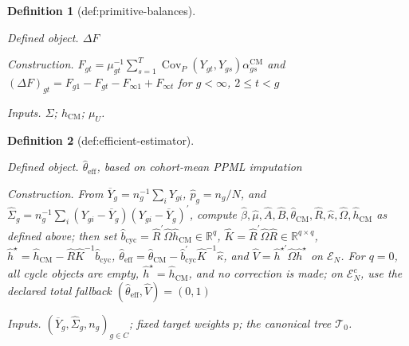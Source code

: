 \documentclass{article}
\newtheorem{definition}{Definition}
\begin{document}
\begin{definition}[def:primitive-balances]\label{def:primitive-balances}
\par\smallskip\noindent\emph{Defined object.} \(\Delta F\)
\par\smallskip\noindent\emph{Construction.} \(F_{gt}=\mu_{gt}^{-1}\sum_{s=1}^T\operatorname{Cov}_P(Y_{gt},Y_{gs})\alpha^{\mathrm{CM}}_{gs}\) and \((\Delta F)_{gt}=F_{g1}-F_{gt}-F_{\infty1}+F_{\infty t}\) for \(g<\infty\), \(2\le t<g\)
\par\smallskip\noindent\emph{Inputs.} \(\Sigma\); \(h_{\mathrm{CM}}\); \(\mu_U\).
\end{definition}

\begin{definition}[def:efficient-estimator]\label{def:efficient-estimator}
\par\smallskip\noindent\emph{Defined object.} \(\widehat\theta_{\mathrm{eff}}\), based on cohort-mean PPML imputation
\par\smallskip\noindent\emph{Construction.} From \(\overline Y_g=n_g^{-1}\sum_iY_{gi}\), \(\widehat p_g=n_g/N\), and \(\widehat\Sigma_g=n_g^{-1}\sum_i(Y_{gi}-\overline Y_g)(Y_{gi}-\overline Y_g)^{\prime}\), compute \(\widehat\beta,\widehat\mu,\widehat A,\widehat B,\widehat\theta_{\mathrm{CM}},\widehat R,\widehat\kappa,\widehat\Omega,\widehat h_{\mathrm{CM}}\) as defined above; then set \(\widehat b_{\mathrm{cyc}}=\widehat R^{\prime}\widehat\Omega\widehat h_{\mathrm{CM}}\in\mathbb R^q\), \(\widehat K=\widehat R^{\prime}\widehat\Omega\widehat R\in\mathbb R^{q\times q}\), \(\widehat h^{\star}=\widehat h_{\mathrm{CM}}-\widehat R\widehat K^{-1}\widehat b_{\mathrm{cyc}}\), \(\widehat\theta_{\mathrm{eff}}=\widehat\theta_{\mathrm{CM}}-\widehat b_{\mathrm{cyc}}^{\prime}\widehat K^{-1}\widehat\kappa\), and \(\widehat V=\widehat h^{\star\prime}\widehat\Omega\widehat h^{\star}\) on \(\mathcal E_N\). For \(q=0\), all cycle objects are empty, \(\widehat h^{\star}=\widehat h_{\mathrm{CM}}\), and no correction is made; on \(\mathcal E_N^c\), use the declared total fallback \((\widehat\theta_{\mathrm{eff}},\widehat V)=(0,1)\)
\par\smallskip\noindent\emph{Inputs.} \((\overline Y_g,\widehat\Sigma_g,n_g)_{g\in C}\); fixed target weights \(p\); the canonical tree \(\mathcal T_0\).
\end{definition}
\end{document}
